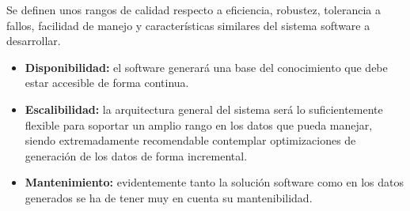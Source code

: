 Se definen unos rangos de calidad respecto a eficiencia, robustez, 
tolerancia a fallos, facilidad de manejo y características similares 
del sistema software a desarrollar.

\begin{itemize}
  \item \textbf{Disponibilidad:} el software generará una base del 
	conocimiento que debe estar accesible de forma continua.
  \item \textbf{Escalibilidad:} la arquitectura general del sistema 
	será lo suficientemente flexible para soportar un amplio
	rango en los datos que pueda manejar, siendo extremadamente
	recomendable contemplar optimizaciones de generación de los 
	datos de forma incremental.
  \item \textbf{Mantenimiento:} evidentemente tanto la solución software 
	como en los datos generados se ha de tener muy en cuenta su
	mantenibilidad.
\end{itemize}




